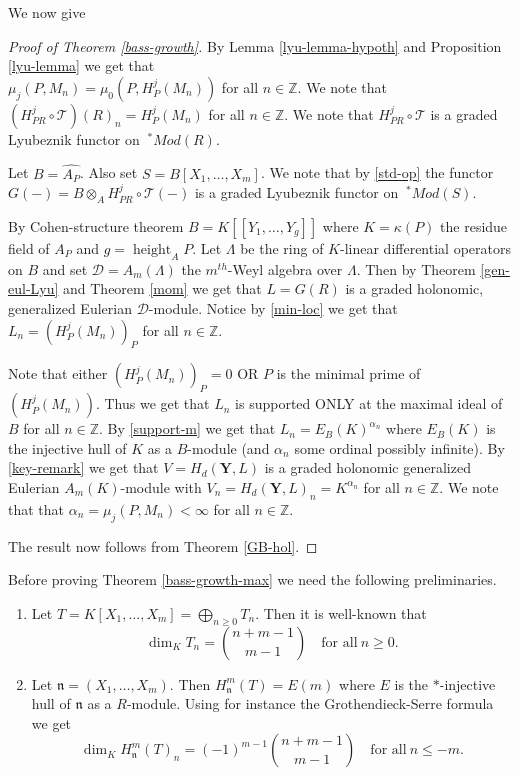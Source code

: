 \documentclass{amsart}
\newcommand{\ZZ}{\mathbb{Z} }
\newcommand{\D}{\mathcal{D} }
\newcommand{\bY}{\mathbf{Y} }
\newcommand{\n}{\mathfrak{n} }
\newcommand{\FF}{\mathcal{T}}
\newcommand{\height}{\operatorname{height}}
\theoremstyle{plain}
\theoremstyle{definition}
\theoremstyle{remark}
\begin{document}
We now give
\begin{proof}[Proof of Theorem \ref{bass-growth}]
By Lemma \ref{lyu-lemma-hypoth} and Proposition \ref{lyu-lemma} we get 
that \\ $\mu_j(P, M_n) = \mu_0(P, H^j_P(M_n))$ for all $n \in \ZZ$.
We note that $(H^j_{PR}\circ \FF)(R)_n = H^j_P(M_n)$ for all $n \in \ZZ$. We note that $H^j_{PR}\circ\FF$ is a graded Lyubeznik functor on $\ ^*Mod(R)$.


Let $B = \widehat{A_P}$. Also 
 set $S = B[X_1,\ldots, X_m]$.
 We note that by \ref{std-op} the functor $G(-) = B \otimes_A H^j_{PR}\circ\FF(-)$ is a graded Lyubeznik functor on $ \ ^* Mod(S)$.
 
 By Cohen-structure theorem $B = K[[Y_1,\ldots, Y_g]]$ where $K = \kappa(P)$ the residue field of $A_P$  and $g = \height_A P$.
 Let $\Lambda $ be the ring of $K$-linear differential operators on $B$ and set $\D = A_m(\Lambda)$ the $m^{th}$-Weyl algebra
 over $\Lambda$. Then by Theorem \ref{gen-eul-Lyu} and Theorem \ref{mom} we get that $L = G(R)$ is a graded holonomic, generalized Eulerian
 $\D$-module. Notice  by \ref{min-loc} we get that 
 $L_n = (H^j_P(M_n))_P $ for all $n \in \ZZ$.
 
 Note that either $(H^j_P(M_n))_P  = 0$ OR
  $P$ is the minimal prime of $(H^j_P(M_n))$. Thus we get that $L_n$ is supported  ONLY at the maximal ideal of $B$ for all $n \in \ZZ$. By \ref{support-m} we get that $L_n = E_B(K)^{\alpha_n}$ where 
 $E_B(K)$ is the injective hull of $K$ as a $B$-module (and $\alpha_n$ some ordinal possibly infinite).  By \ref{key-remark} we get that
$V = H_d(\bY, L)$ is a graded holonomic generalized Eulerian $A_m(K)$-module with $V_n = H_d(\bY, L)_n = K^{\alpha_n}$ for all $n \in \ZZ$.
We note that
  that $ \alpha_n = \mu_j(P, M_n)  < \infty$ for all $n \in \ZZ$.
  
  The result now follows from Theorem \ref{GB-hol}.
\end{proof}
\s \label{hilb} Before proving Theorem \ref{bass-growth-max} we need the following preliminaries. 
\begin{enumerate}
\item
Let $T = K[X_1,\ldots, X_m] = \bigoplus_{n \geq 0} T_n$. Then it is well-known that
\[
\dim_K T_n = \binom{n + m -1}{m-1} \quad \text{for all} \ n \geq 0.
\]
\item
Let $\n = (X_1,\ldots, X_m)$. Then $H^m_\n(T) = E(m)$ where $E$ is the $*$-injective hull of $\n$ as a $R$-module. Using for instance the Grothendieck-Serre formula \cite[4.4.3]{BH} we get
\[
\dim_K H^m_\n(T)_n = (-1)^{m-1} \binom{n + m -1}{m-1} \quad \text{for all} \ n \leq -m.
\]
\end{enumerate}
\end{document}
